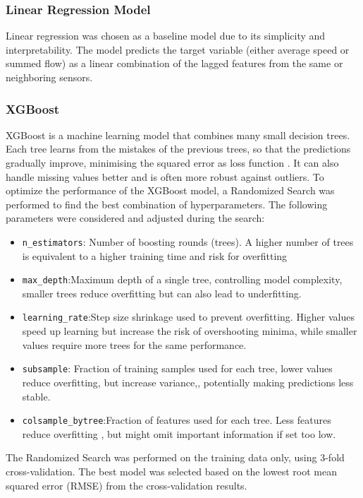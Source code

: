 	\subsubsection{Linear Regression Model}
	Linear regression was chosen as a baseline model due to its simplicity and interpretability. The model predicts the target variable (either average speed or summed flow) as a linear combination of the lagged features from the same or neighboring sensors.
	\subsubsection{XGBoost}
	XGBoost is a machine learning model that combines many small decision trees. Each tree learns from the mistakes of the previous trees, so that the predictions gradually improve, minimising the squared error as loss function \cite{xgboost_loss}.  It can also handle missing values better and is often more robust against outliers.
	To optimize the performance of the XGBoost model, a Randomized Search was performed to find the best combination of hyperparameters. The following parameters were considered and adjusted during the search:
	\begin{itemize}
		\item \texttt{n\_estimators}: Number of boosting rounds (trees). A higher number of trees is equivalent to a higher training time and risk for overfitting
		\item \texttt{max\_depth}:Maximum depth of a single tree, controlling model complexity, smaller trees reduce overfitting but can also lead to underfitting.
		\item \texttt{learning\_rate}:Step size shrinkage used to prevent overfitting. Higher values speed up learning but increase the risk of overshooting minima, while smaller values require more trees for the same performance.
		\item \texttt{subsample}: Fraction of training samples used for each tree, lower values reduce overfitting, but increase variance,, potentially making predictions less stable.
		\item  \texttt{colsample\_bytree}:Fraction of features used for each tree. Less features reduce overfitting , but might omit important information if set too low.	
	\end{itemize}
	The Randomized Search was performed on the training data only, using 3-fold cross-validation.
	The best model was selected based on the lowest root mean squared error (RMSE) from the cross-validation results.
